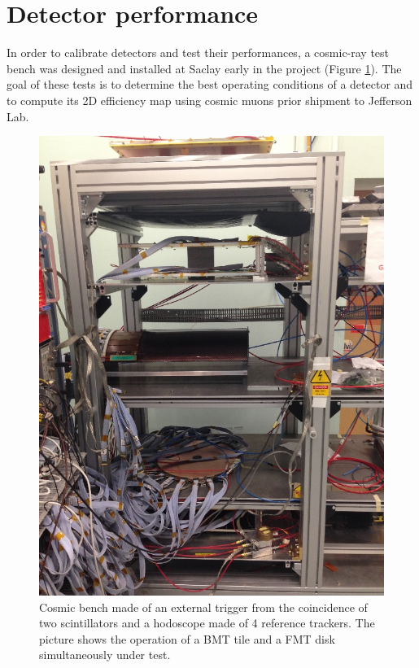 \section{Detector performance}

In order to calibrate detectors and test their performances, a cosmic-ray test bench was designed and installed at Saclay early in the project (Figure \ref{fig:mm-testbench}). The goal of these tests is to determine the best operating conditions of a detector and to compute its 2D efficiency map using cosmic muons prior shipment to Jefferson Lab.


\begin{figure}[htb]
 \includegraphics[width=1.0\columnwidth,keepaspectratio]{images/banc_cosmique}
 \caption{Cosmic bench made of an external trigger from the coincidence of two scintillators and a hodoscope made of 4 
reference trackers. The picture shows the operation of a BMT tile and a FMT disk simultaneously under test.}
 \label{fig:mm-testbench}
\end{figure}

